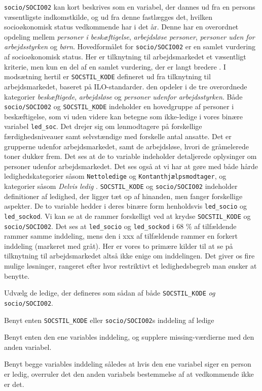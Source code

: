 \texttt{socio/SOCIO02} kan kort beskrives som en variabel, der dannes ud fra en persons væsentligste indkomstkilde, og ud fra denne fastlægges det, hvilken socioøkonomisk status vedkommende har i det år. Denne har en overordnet opdeling mellem \emph{personer i beskæftigelse}, \emph{arbejdsløse personer},
\emph{personer uden for arbejdsstyrken} og \emph{børn}. Hovedformålet for \texttt{socio/SOCIO02} er en samlet vurdering af socioøkonomisk status. Her er tilknytning til arbejdsmarkedet et væsentligt kriterie, men kun en del af en samlet vurdering, der er langt bredere \parencite[8]{Plovsing1997}. 
I modsætning hertil er \texttt{SOCSTIL\_KODE} defineret ud fra tilknytning til arbejdsmarkedet, baseret på ILO-standarder. den opdeler i de tre overordnede kategorier \emph{beskæftigede}, \emph{arbejdsløse} og \emph{personer udenfor arbejdsstyrken}. 
Både \texttt{socio/SOCIO02} og \texttt{SOCSTIL\_KODE} indeholder en hovedgruppe af personer i beskæftigelse, som vi uden videre kan betegne som ikke-ledige i vores binære variabel \texttt{led\_soc}.  Det drejer sig om lønmodtagere på forskellige færdighedsniveauer samt selvstændige med forskelle antal ansatte. Det er grupperne udenfor arbejdsmarkedet, samt de arbejdsløse, hvori de gråmelerede toner dukker frem. 
Det ses at de to variable indeholder detaljerede oplysinger om personer udenfor arbejdsmarkedet. Det ses også at vi har at gøre med både hårde ledighedskategorier såsom \texttt{Nettoledige} og \texttt{Kontanthjælpsmodtager}, og kategorier såsom \emph{Delvis ledig} %
. \texttt{SOCSTIL\_KODE} og \texttt{socio/SOCIO02} indeholder definitioner af ledighed, der ligger tæt op af hinanden, men fanger forskellige aspekter. De to variable hedder i deres binære form henholdsvis \texttt{led\_socio} og \texttt{led\_sockod}. Vi kan se at de rammer forskelligt ved at krydse \texttt{SOCSTIL\_KODE} og \texttt{socio/SOCIO02}.
Det ses at \texttt{led\_socio} og \texttt{led\_sockod} i 68 \% af tilfældende %
rammer samme inddeling, mens den  i xxx af tilfældende rammer en forkert inddeling (markeret med gråt). Her er vores to primære kilder til at se på tilknytning til arbejdsmarkedet altså ikke enige om inddelingen. Det giver os fire mulige løsninger, rangeret efter hvor restriktivt et ledighedsbegreb man ønsker at benytte.
%
\begin{description} [topsep=6pt,itemsep=-1ex]
  \item[Restriktiv] Udvælg de ledige, der defineres som sådan af både \texttt{SOCSTIL\_KODE} \emph{og} \texttt{socio/SOCIO02}.
  \item[Semirestriktiv] Benyt enten \texttt{SOCSTIL\_KODE} eller \texttt{socio/SOCIO02}s inddeling af ledige
  \item[Semibred] Benyt enten den ene variables inddeling, og supplere missing-værdierne med den anden variabel.
 \item[Bred] Benyt begge variables inddeling således at hvis den ene variabel siger en person er ledig, overruler det den anden variabels bestemmelse af at vedkommende ikke er det.
\end{description}
